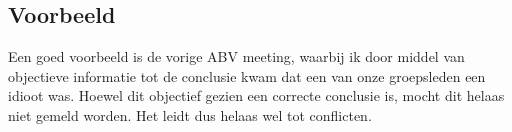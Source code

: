 \documentclass[11pt,english]{article}
\begin{document}
	\subsection{Voorbeeld}
	Een goed voorbeeld is de vorige ABV meeting, waarbij ik door middel van
	objectieve informatie tot de conclusie kwam dat een van onze groepsleden
	een idioot was. Hoewel dit objectief gezien een correcte conclusie is,
	mocht dit helaas niet gemeld worden. Het leidt dus helaas wel tot
	conflicten.
\end{document}
